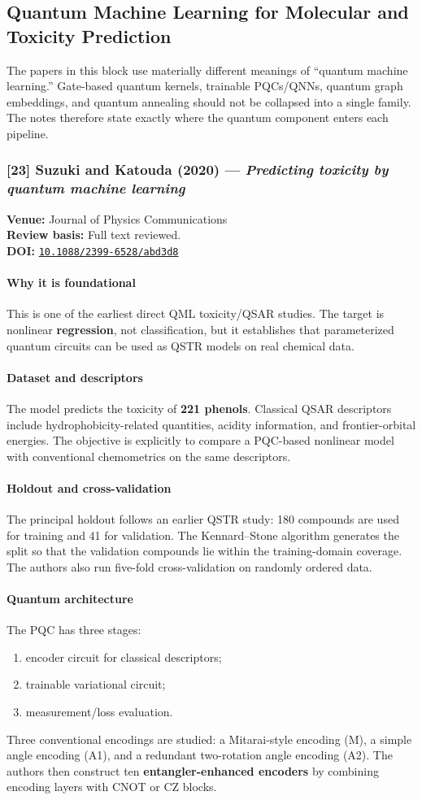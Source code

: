 \documentclass[11pt]{article}
\newcommand{\reviewfield}[2]{\paragraph{#1}#2}
\newcommand{\paperdoi}[1]{\href{https://doi.org/#1}{\texttt{#1}}}
\begin{document}
\subsection{Quantum Machine Learning for Molecular and Toxicity Prediction}

The papers in this block use materially different meanings of ``quantum machine learning.'' Gate-based quantum kernels, trainable PQCs/QNNs, quantum graph embeddings, and quantum annealing should not be collapsed into a single family. The notes therefore state exactly where the quantum component enters each pipeline.

\subsubsection{[23] Suzuki and Katouda (2020) --- \textit{Predicting toxicity by quantum machine learning}}
\textbf{Venue:} Journal of Physics Communications\\
\textbf{Review basis:} Full text reviewed.\\
\textbf{DOI:} \paperdoi{10.1088/2399-6528/abd3d8}

\reviewfield{Why it is foundational}{
This is one of the earliest direct QML toxicity/QSAR studies. The target is nonlinear \textbf{regression}, not classification, but it establishes that parameterized quantum circuits can be used as QSTR models on real chemical data.
}

\reviewfield{Dataset and descriptors}{
The model predicts the toxicity of \textbf{221 phenols}. Classical QSAR descriptors include hydrophobicity-related quantities, acidity information, and frontier-orbital energies. The objective is explicitly to compare a PQC-based nonlinear model with conventional chemometrics on the same descriptors.
}

\reviewfield{Holdout and cross-validation}{
The principal holdout follows an earlier QSTR study: 180 compounds are used for training and 41 for validation. The Kennard--Stone algorithm generates the split so that the validation compounds lie within the training-domain coverage. The authors also run five-fold cross-validation on randomly ordered data.
}

\reviewfield{Quantum architecture}{
The PQC has three stages:
\begin{enumerate}
    \item encoder circuit for classical descriptors;
    \item trainable variational circuit;
    \item measurement/loss evaluation.
\end{enumerate}

Three conventional encodings are studied: a Mitarai-style encoding (M), a simple angle encoding (A1), and a redundant two-rotation angle encoding (A2). The authors then construct ten \textbf{entangler-enhanced encoders} by combining encoding layers with CNOT or CZ blocks.
}
\end{document}
